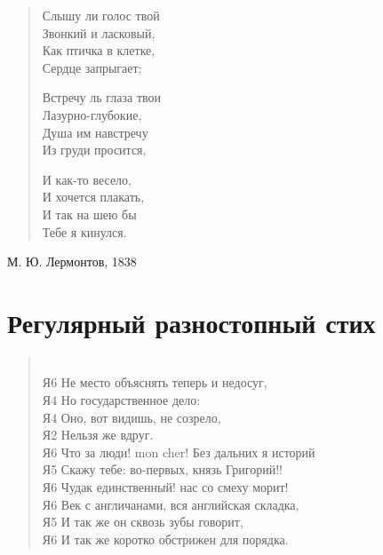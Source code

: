 \documentclass{beamer}
\begin{document}
\begin{frame}

\begin{verse}
Слышу ли голос твой\\
Звонкий и ласковый,\\
\alert{Как птичка в клетке},\\
Сердце запрыгает;

Встречу ль глаза твои\\
\alert{Лазурно-глубокие},\\
Душа им навстречу\\
Из груди просится,

И как-то весело,\\
И хочется плакать,\\
И так на шею бы\\
Тебе я кинулся.

\end{verse}

М. Ю. Лермонтов, 1838

\end{frame}


\section{Регулярный разностопный стих}\label{sec:varstep} %

\begin{frame}

\begin{verse}
\\
Я6 Не место объяснять теперь и недосуг,	\\
Я4 Но государственное дело:	\\
Я4 Оно, вот видишь, не созрело,	\\
Я2 Нельзя же вдруг.	\\
Я6 Что за люди! mon cher! Без дальних я историй	\\
Я5 Скажу тебе: во-первых, князь Григорий!!\\
Я6 Чудак единственный! нас со смеху морит!\\
Я6 Век с англичанами, вся английская складка,\\
Я5 И так же он сквозь зубы говорит,\\
Я6 И так же коротко обстрижен для порядка.	

\end{verse}
\end{frame}
\end{document}
